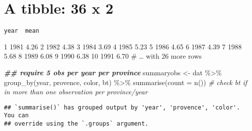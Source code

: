 \documentclass[
]{article}
\newenvironment{Shaded}{\begin{snugshade}}{\end{snugshade}}
\newcommand{\AttributeTok}[1]{\textcolor[rgb]{0.77,0.63,0.00}{#1}}
\newcommand{\CommentTok}[1]{\textcolor[rgb]{0.56,0.35,0.01}{\textit{#1}}}
\newcommand{\ConstantTok}[1]{\textcolor[rgb]{0.00,0.00,0.00}{#1}}
\newcommand{\DecValTok}[1]{\textcolor[rgb]{0.00,0.00,0.81}{#1}}
\newcommand{\DocumentationTok}[1]{\textcolor[rgb]{0.56,0.35,0.01}{\textbf{\textit{#1}}}}
\newcommand{\FunctionTok}[1]{\textcolor[rgb]{0.00,0.00,0.00}{#1}}
\newcommand{\NormalTok}[1]{#1}
\newcommand{\OtherTok}[1]{\textcolor[rgb]{0.56,0.35,0.01}{#1}}
\newcommand{\SpecialCharTok}[1]{\textcolor[rgb]{0.00,0.00,0.00}{#1}}
\newcommand{\StringTok}[1]{\textcolor[rgb]{0.31,0.60,0.02}{#1}}
\begin{document}
\hypertarget{a-tibble-36-x-2}{%
\section{A tibble: 36 x 2}\label{a-tibble-36-x-2}}

\begin{verbatim}
year  mean
\end{verbatim}

1 1981 4.26 2 1982 4.38 3 1984 3.69 4 1985 5.23 5 1986 4.65 6 1987 4.39
7 1988 5.68 8 1989 6.08 9 1990 6.38 10 1991 6.70 \# \ldots{} with 26
more rows

\begin{Shaded}
\begin{Highlighting}[]
\DocumentationTok{\#\# require 5 obs per year per province}
\NormalTok{summaryobs }\OtherTok{\textless{}{-}}\NormalTok{ dat }\SpecialCharTok{\%\textgreater{}\%} \FunctionTok{group\_by}\NormalTok{(year, provence, color, bt) }\SpecialCharTok{\%\textgreater{}\%}
  \FunctionTok{summarise}\NormalTok{(}\AttributeTok{count =} \FunctionTok{n}\NormalTok{()) }\CommentTok{\# check bt if in more than one observation per province/year}
\end{Highlighting}
\end{Shaded}

\begin{verbatim}
## `summarise()` has grouped output by 'year', 'provence', 'color'. You can
## override using the `.groups` argument.
\end{verbatim}

\begin{Shaded}
\end{Shaded}
\end{document}
